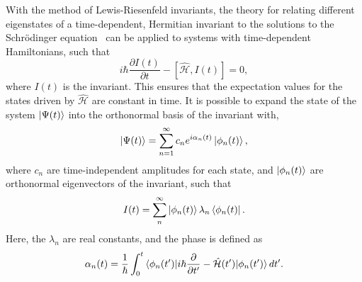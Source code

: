 With the method of Lewis-Riesenfeld invariants, the theory for relating different eigenstates of a time-dependent, Hermitian invariant to the solutions to the Schr\"odinger equation~\cite{lewis1969} can be applied to systems with time-dependent Hamiltonians, such that
\begin{equation}
i\hbar \frac{\partial I(t)}{\partial t} - \left[\mathcal{\hat H},I(t)\right] = 0,
\end{equation}
\noindent where $I(t)$ is the invariant.
This ensures that the expectation values for the states driven by $\mathcal{\hat H}$ are constant in time.
It is possible to expand the state of the system $\ket{\Psi(t)}$ into the orthonormal basis of the invariant with,
\begin{equation}
\ket{\Psi(t)} =\sum_{n=1}^\infty c_n e^{i\alpha_n(t)} \ket{\phi_n(t)},
\end{equation}
\noindent where $c_n$ are time-independent amplitudes for each state, and $\ket{\phi_n(t)}$ are orthonormal eigenvectors of the invariant, such that
\begin{equation}
I(t) = \sum_n^\infty\ket{\phi_n(t)}\lambda_n\bra{\phi_n(t)}.
\end{equation}
\noindent Here, the $\lambda_n$ are real constants, and the phase is defined as ~\cite{lewis1969}
\begin{equation}
\alpha_n(t) = \frac{1}{\hbar}\int_0^t\braket{\phi_n(t')|i\hbar\frac{\partial}{\partial t'} - \mathcal{\hat H}(t')|\phi_n(t')}dt'.
\end{equation}

